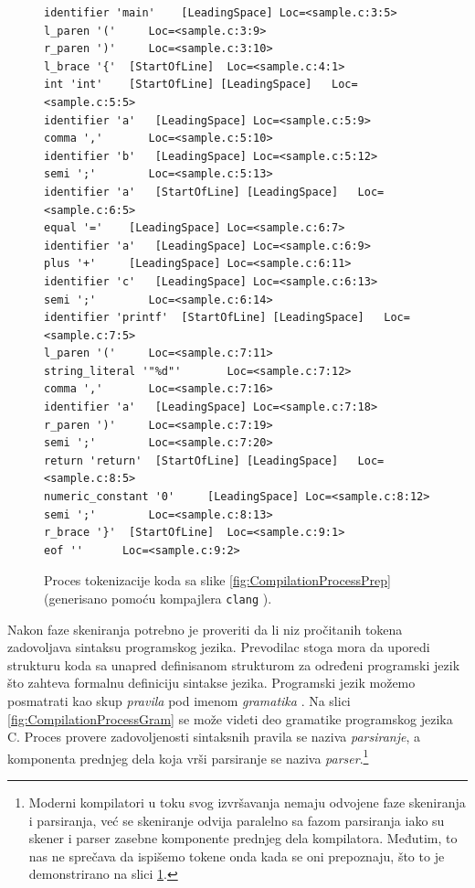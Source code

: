 \begin{figure}[h!]
\begin{lstlisting}[language={}]
identifier 'main'	 [LeadingSpace]	Loc=<sample.c:3:5>
l_paren '('		Loc=<sample.c:3:9>
r_paren ')'		Loc=<sample.c:3:10>
l_brace '{'	 [StartOfLine]	Loc=<sample.c:4:1>
int 'int'	 [StartOfLine] [LeadingSpace]	Loc=<sample.c:5:5>
identifier 'a'	 [LeadingSpace]	Loc=<sample.c:5:9>
comma ','		Loc=<sample.c:5:10>
identifier 'b'	 [LeadingSpace]	Loc=<sample.c:5:12>
semi ';'		Loc=<sample.c:5:13>
identifier 'a'	 [StartOfLine] [LeadingSpace]	Loc=<sample.c:6:5>
equal '='	 [LeadingSpace]	Loc=<sample.c:6:7>
identifier 'a'	 [LeadingSpace]	Loc=<sample.c:6:9>
plus '+'	 [LeadingSpace]	Loc=<sample.c:6:11>
identifier 'c'	 [LeadingSpace]	Loc=<sample.c:6:13>
semi ';'		Loc=<sample.c:6:14>
identifier 'printf'	 [StartOfLine] [LeadingSpace]	Loc=<sample.c:7:5>
l_paren '('		Loc=<sample.c:7:11>
string_literal '"%d"'		Loc=<sample.c:7:12>
comma ','		Loc=<sample.c:7:16>
identifier 'a'	 [LeadingSpace]	Loc=<sample.c:7:18>
r_paren ')'		Loc=<sample.c:7:19>
semi ';'		Loc=<sample.c:7:20>
return 'return'	 [StartOfLine] [LeadingSpace]	Loc=<sample.c:8:5>
numeric_constant '0'	 [LeadingSpace]	Loc=<sample.c:8:12>
semi ';'		Loc=<sample.c:8:13>
r_brace '}'	 [StartOfLine]	Loc=<sample.c:9:1>
eof ''		Loc=<sample.c:9:2>
\end{lstlisting}
\caption{Proces tokenizacije koda sa slike \ref{fig:CompilationProcessPrep} (generisano pomoću kompajlera \texttt{clang} \cite{Clang}).}
\label{fig:CompilationProcessLex}
\end{figure}

Nakon faze skeniranja potrebno je proveriti da li niz pročitanih tokena zadovoljava sintaksu programskog jezika. Prevodilac stoga mora da uporedi strukturu koda sa unapred definisanom strukturom za određeni programski jezik što zahteva formalnu definiciju sintakse jezika. Programski jezik možemo posmatrati kao skup \emph{pravila} pod imenom \emph{gramatika} \cite{AutomataTheory}. Na slici \ref{fig:CompilationProcessGram} se može videti deo gramatike programskog jezika C. Proces provere zadovoljenosti sintaksnih pravila se naziva \emph{parsiranje}, a komponenta prednjeg dela koja vrši parsiranje se naziva \emph{parser}.\footnote{Moderni kompilatori u toku svog izvršavanja nemaju odvojene faze skeniranja i parsiranja, već se skeniranje odvija paralelno sa fazom parsiranja iako su skener i parser zasebne komponente prednjeg dela kompilatora. Međutim, to nas ne sprečava da ispišemo tokene onda kada se oni prepoznaju, što to je demonstrirano na slici \ref{fig:CompilationProcessLex}.}

